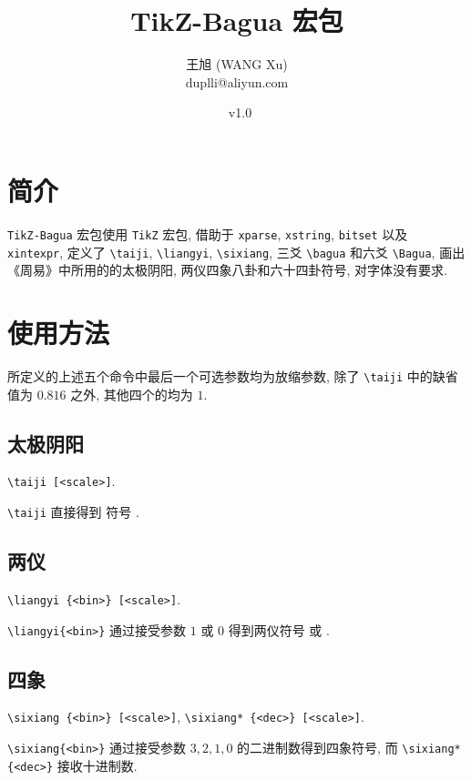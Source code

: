 \documentclass{article}
\title{TikZ-Bagua 宏包}
\author{王旭 (WANG Xu) \\ duplli@aliyun.com}
\date{\zhtoday~v1.0}
\begin{document}
\maketitle

\section{简介}

\verb+TikZ-Bagua+ 宏包使用 \verb+TikZ+ 宏包, 借助于 \verb+xparse+, \verb+xstring+, \verb+bitset+ 以及 \verb+xintexpr+, 定义了 \verb+\taiji+, \verb+\liangyi+, \verb+\sixiang+, 三爻 \verb+\bagua+ 和六爻 \verb+\Bagua+,  画出《周易》中所用的的太极阴阳, 两仪四象八卦和六十四卦符号, 对字体没有要求.

\section{使用方法}

所定义的上述五个命令中最后一个可选参数均为放缩参数, 除了 \verb+\taiji+ 中的缺省值为 $0.816$ 之外, 其他四个的均为 $1$.

\subsection{太极阴阳}
\verb+\taiji [<scale>]+.

\verb+\taiji+ 直接得到 符号 \taiji{}.

\subsection{两仪}
\verb+\liangyi {<bin>} [<scale>]+.

\verb+\liangyi{<bin>}+ 通过接受参数 $1$ 或 $0$ 得到两仪符号  或 .

\subsection{四象}
\verb+\sixiang {<bin>} [<scale>]+, \verb+\sixiang* {<dec>} [<scale>]+.

\verb+\sixiang{<bin>}+ 通过接受参数 $3,2,1,0$ 的二进制数得到四象符号, 而 \verb+\sixiang*{<dec>}+ 接收十进制数.

\begin{center}
\end{center}
\end{document}
